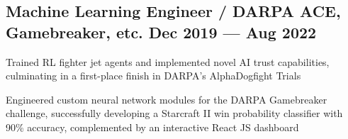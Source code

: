 \subsection{{Machine Learning Engineer / DARPA ACE, Gamebreaker, etc. \hfill Dec 2019 --- Aug 2022}}
\begin{zitemize}
	\item Trained RL fighter jet agents and implemented novel AI trust capabilities, culminating in a first-place finish in DARPA's AlphaDogfight Trials
	\item Engineered custom neural network modules for the DARPA Gamebreaker challenge, successfully developing a Starcraft II win probability classifier with 90\% accuracy, complemented by an interactive React JS dashboard

\end{zitemize}



